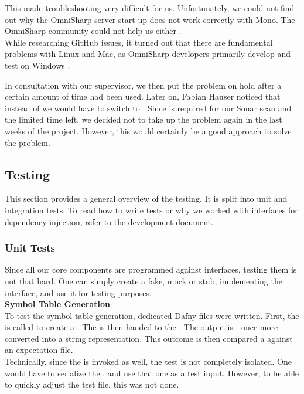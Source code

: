 This made troubleshooting very difficult for us.
Unfortunately, we could not find out why the OmniSharp server start-up does not work correctly with Mono.
The OmniSharp community could not help us either \cite{mono-slack}.\\

While researching GitHub issues, it turned out that there are fundamental problems with Linux and Mac,
as OmniSharp developers primarily develop and test on Windows \cite{mono-git}.

In consultation with our supervisor, we then put the problem on hold after a certain amount of time had been used.
Later on, Fabian Hauser noticed that instead of  we would have to switch to .
Since  is required for our Sonar scan and the limited time left,
we decided not to take up the problem again in the last weeks of the project.
However, this would certainly be a good approach to solve the problem.

\subsection{Testing}

This section provides a general overview of the testing.
It is split into unit and integration tests.
To read how to write tests or why we worked with interfaces for dependency injection, refer to the development document.

\subsubsection{Unit Tests}
Since all our core components are programmed against interfaces, testing them is not that hard.
One can simply create a fake, mock or stub, implementing the interface, and use it for testing purposes.\\

\textbf{Symbol Table Generation}\\
To test the symbol table generation, dedicated Dafny files were written.
First, the  is called to create a .
The  is then handed to the .
The output is - once more - converted into a string representation.
This outcome is then compared a against an expectation file.\\

Technically, since the  is invoked as well, the test is not completely isolated.
One would have to serialize the , and use that one as a test input.
However, to be able to quickly adjust the test file, this was not done.\\

